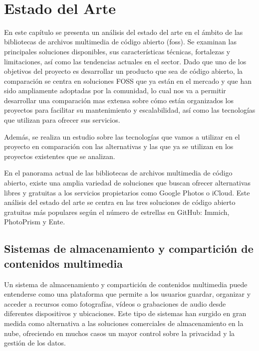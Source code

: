 \newpage
~
\newpage
\chapter{Estado del Arte}
\label{ch:estado_del_arte}

En este capítulo se presenta un análisis del estado del arte en el ámbito de las bibliotecas de archivos multimedia de código abierto (\acrfull{foss}).
Se examinan las principales soluciones disponibles, sus características técnicas, fortalezas y limitaciones, así como las tendencias actuales en el sector.
Dado que uno de los objetivos del proyecto es desarrollar un producto que sea de código abierto, la comparación se centra en soluciones FOSS que ya están en el mercado y que han sido ampliamente adoptadas por la comunidad, lo cual nos va a permitir desarrollar una comparación mas extensa sobre cómo están organizados los proyectos para facilitar su mantenimiento y escalabilidad, así como las tecnologías que utilizan para ofrecer sus servicios.

Además, se realiza un estudio sobre las tecnologías que vamos a utilizar en el proyecto en comparación con las alternativas y las que ya se utilizan en los proyectos existentes que se analizan.

En el panorama actual de las bibliotecas de archivos multimedia de código abierto, existe una amplia variedad de soluciones que buscan ofrecer alternativas libres y gratuitas a los servicios propietarios como Google Photos o iCloud. Este análisis del estado del arte se centra en las tres soluciones de código abierto gratuitas más populares según el número de estrellas en GitHub: Immich, PhotoPrism y Ente.

\section{Sistemas de almacenamiento y compartición de contenidos multimedia}

Un sistema de almacenamiento y compartición de contenidos multimedia puede entenderse como una plataforma que permite a los usuarios guardar, organizar y acceder a recursos como fotografías, vídeos o grabaciones de audio desde diferentes dispositivos y ubicaciones. Este tipo de sistemas han surgido en gran medida como alternativa a las soluciones comerciales de almacenamiento en la nube, ofreciendo en muchos casos un mayor control sobre la privacidad y la gestión de los datos.

